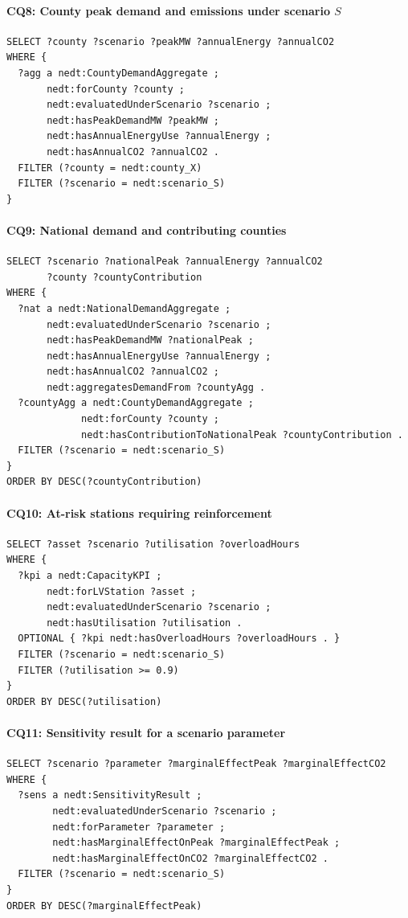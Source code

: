 \documentclass[preprint,12pt]{elsarticle}
\begin{document}
\paragraph{CQ8: County peak demand and emissions under scenario $S$}
\begin{verbatim}
SELECT ?county ?scenario ?peakMW ?annualEnergy ?annualCO2
WHERE {
  ?agg a nedt:CountyDemandAggregate ;
       nedt:forCounty ?county ;
       nedt:evaluatedUnderScenario ?scenario ;
       nedt:hasPeakDemandMW ?peakMW ;
       nedt:hasAnnualEnergyUse ?annualEnergy ;
       nedt:hasAnnualCO2 ?annualCO2 .
  FILTER (?county = nedt:county_X)
  FILTER (?scenario = nedt:scenario_S)
}
\end{verbatim}

\paragraph{CQ9: National demand and contributing counties}
\begin{verbatim}
SELECT ?scenario ?nationalPeak ?annualEnergy ?annualCO2
       ?county ?countyContribution
WHERE {
  ?nat a nedt:NationalDemandAggregate ;
       nedt:evaluatedUnderScenario ?scenario ;
       nedt:hasPeakDemandMW ?nationalPeak ;
       nedt:hasAnnualEnergyUse ?annualEnergy ;
       nedt:hasAnnualCO2 ?annualCO2 ;
       nedt:aggregatesDemandFrom ?countyAgg .
  ?countyAgg a nedt:CountyDemandAggregate ;
             nedt:forCounty ?county ;
             nedt:hasContributionToNationalPeak ?countyContribution .
  FILTER (?scenario = nedt:scenario_S)
}
ORDER BY DESC(?countyContribution)
\end{verbatim}

\paragraph{CQ10: At-risk stations requiring reinforcement}
\begin{verbatim}
SELECT ?asset ?scenario ?utilisation ?overloadHours
WHERE {
  ?kpi a nedt:CapacityKPI ;
       nedt:forLVStation ?asset ;
       nedt:evaluatedUnderScenario ?scenario ;
       nedt:hasUtilisation ?utilisation .
  OPTIONAL { ?kpi nedt:hasOverloadHours ?overloadHours . }
  FILTER (?scenario = nedt:scenario_S)
  FILTER (?utilisation >= 0.9)
}
ORDER BY DESC(?utilisation)
\end{verbatim}

\paragraph{CQ11: Sensitivity result for a scenario parameter}
\begin{verbatim}
SELECT ?scenario ?parameter ?marginalEffectPeak ?marginalEffectCO2
WHERE {
  ?sens a nedt:SensitivityResult ;
        nedt:evaluatedUnderScenario ?scenario ;
        nedt:forParameter ?parameter ;
        nedt:hasMarginalEffectOnPeak ?marginalEffectPeak ;
        nedt:hasMarginalEffectOnCO2 ?marginalEffectCO2 .
  FILTER (?scenario = nedt:scenario_S)
}
ORDER BY DESC(?marginalEffectPeak)
\end{verbatim}
\end{document}
